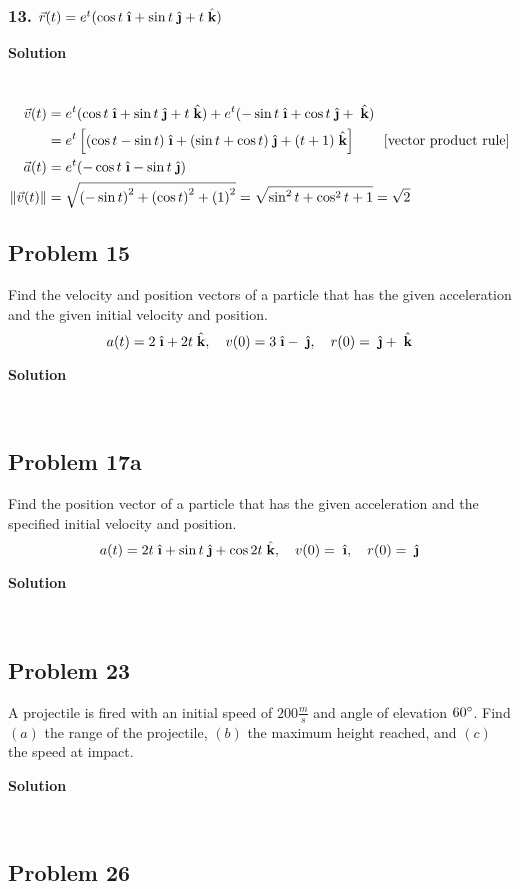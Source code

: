 \documentclass{article}
\newcommand{\ihat}{\;\hat{\textbf{\i}}}
\newcommand{\jhat}{\;\hat{\textbf{\j}}}
\newcommand{\khat}{\;\hat{\textbf{k}}}
\newcommand{\rvec}{\vec{r}(t)}
\newcommand\vc[2]{\vec{#1}(#2)}
\newcommand\mgv[1]{\|#1\|}
\newcommand\mgvvv[3]{\sqrt{\left(#1\right)^2 + \left(#2\right)^2 + \left(#3\right)^2}}
\begin{document}
\subsubsection*{13. $\rvec = e^t(\cos t\ihat + \sin t\jhat + t\khat)$}
\centerline{\textbf{Solution}} \\
\begin{align*}
    \vc v t &= e^t(\cos t\ihat + \sin t\jhat + t\khat) + e^t(-\sin t\ihat + \cos t\jhat + \khat)  \\
            &= e^t\left[(\cos t - \sin t)\ihat + (\sin t + \cos t)\jhat + (t + 1)\khat\right] \qquad [\text{vector product rule}] \\
    \vc a t &= e^t(-\cos t\ihat - \sin t\jhat) \\
    \mgv{\vc v t} &= \mgvvv{-\sin t}{\cos t}{1} = \sqrt{\sin^2 t + \cos^2 t + 1} = \sqrt 2
\end{align*}
\subsection*{Problem 15}

Find the velocity and position vectors of a particle that has the given acceleration and the given initial velocity and position.
\[
    a(t) = 2\ihat + 2t\khat, \quad v(0) = 3\ihat - \jhat, \quad r(0) = \jhat + \khat
\]
\centerline{\textbf{Solution}} \\
\subsection*{Problem 17a}

Find the position vector of a particle that has the given acceleration and the specified initial velocity and position.
\[
    a(t) = 2t\ihat + \sin t\jhat + \cos 2t\khat, \quad v(0) = \ihat, \quad r(0) = \jhat
\]
\centerline{\textbf{Solution}} \\
\subsection*{Problem 23}

A projectile is fired with an initial speed of $200\frac m s$ and angle of elevation $60 \degree$. Find $(a)$ the range of the projectile, $(b)$ the maximum height reached, and $(c)$ the speed at impact.

\centerline{\textbf{Solution}} \\
\subsection*{Problem 26}
\end{document}

